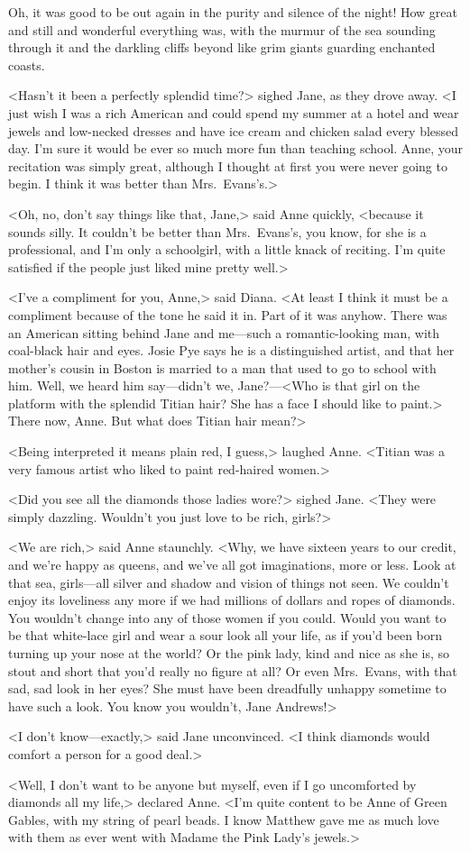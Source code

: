 Oh, it was good to be out again in the purity and silence of the night! How great and still and wonderful everything was, with the murmur of the sea sounding through it and the darkling cliffs beyond like grim giants guarding enchanted coasts.

<Hasn't it been a perfectly splendid time?> sighed Jane, as they drove away. <I just wish I was a rich American and could spend my summer at a hotel and wear jewels and low-necked dresses and have ice cream and chicken salad every blessed day. I'm sure it would be ever so much more fun than teaching school. Anne, your recitation was simply great, although I thought at first you were never going to begin. I think it was better than Mrs.~Evans's.>

<Oh, no, don't say things like that, Jane,> said Anne quickly, <because it sounds silly. It couldn't be better than Mrs.~Evans's, you know, for she is a professional, and I'm only a schoolgirl, with a little knack of reciting. I'm quite satisfied if the people just liked mine pretty well.>

<I've a compliment for you, Anne,> said Diana. <At least I think it must be a compliment because of the tone he said it in. Part of it was anyhow. There was an American sitting behind Jane and me—such a romantic-looking man, with coal-black hair and eyes. Josie Pye says he is a distinguished artist, and that her mother's cousin in Boston is married to a man that used to go to school with him. Well, we heard him say—didn't we, Jane?—<Who is that girl on the platform with the splendid Titian hair? She has a face I should like to paint.> There now, Anne. But what does Titian hair mean?>

<Being interpreted it means plain red, I guess,> laughed Anne. <Titian was a very famous artist who liked to paint red-haired women.>

<Did you see all the diamonds those ladies wore?> sighed Jane. <They were simply dazzling. Wouldn't you just love to be rich, girls?>

<We are rich,> said Anne staunchly. <Why, we have sixteen years to our credit, and we're happy as queens, and we've all got imaginations, more or less. Look at that sea, girls—all silver and shadow and vision of things not seen. We couldn't enjoy its loveliness any more if we had millions of dollars and ropes of diamonds. You wouldn't change into any of those women if you could. Would you want to be that white-lace girl and wear a sour look all your life, as if you'd been born turning up your nose at the world? Or the pink lady, kind and nice as she is, so stout and short that you'd really no figure at all? Or even Mrs.~Evans, with that sad, sad look in her eyes? She must have been dreadfully unhappy sometime to have such a look. You know you wouldn't, Jane Andrews!>

<I don't know—exactly,> said Jane unconvinced. <I think diamonds would comfort a person for a good deal.>

<Well, I don't want to be anyone but myself, even if I go uncomforted by diamonds all my life,> declared Anne. <I'm quite content to be Anne of Green Gables, with my string of pearl beads. I know Matthew gave me as much love with them as ever went with Madame the Pink Lady's jewels.>